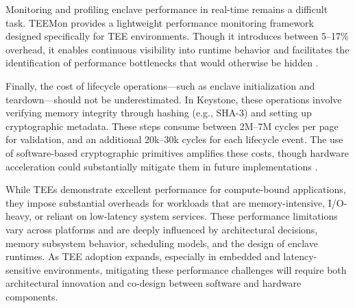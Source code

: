Monitoring and profiling enclave performance in real-time remains a difficult task. TEEMon provides a lightweight performance monitoring framework designed specifically for TEE environments. Though it introduces between 5–17\% overhead, it enables continuous visibility into runtime behavior and facilitates the identification of performance bottlenecks that would otherwise be hidden \cite{krahn2020teemon}.

Finally, the cost of lifecycle operations—such as enclave initialization and teardown—should not be underestimated. In Keystone, these operations involve verifying memory integrity through hashing (e.g., SHA-3) and setting up cryptographic metadata. These steps consume between 2M–7M cycles per page for validation, and an additional 20k–30k cycles for each lifecycle event. The use of software-based cryptographic primitives amplifies these costs, though hardware acceleration could substantially mitigate them in future implementations \cite{dayeol2019keystone}.

While TEEs demonstrate excellent performance for compute-bound applications, they impose substantial overheads for workloads that are memory-intensive, I/O-heavy, or reliant on low-latency system services. These performance limitations vary across platforms and are deeply influenced by architectural decisions, memory subsystem behavior, scheduling models, and the design of enclave runtimes. As TEE adoption expands, especially in embedded and latency-sensitive environments, mitigating these performance challenges will require both architectural innovation and co-design between software and hardware components.


